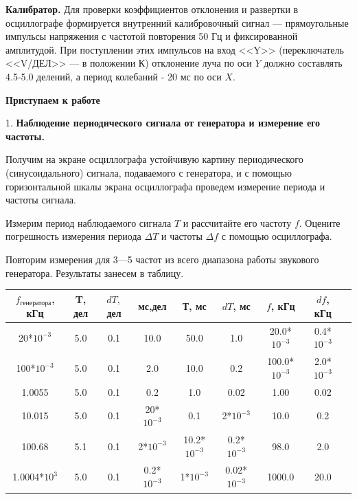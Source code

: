 \documentclass[14pt]{article}
\begin{document}
%
%

\vspace{0.5cm}
\textbf{Калибратор.} Для проверки коэффициентов отклонения и развертки в осциллографе формируется внутренний калибровочный сигнал --- прямоугольные импульсы напряжения с частотой повторения 50 Гц и фиксированной амплитудой. При поступлении этих импульсов на вход <<Y>> (переключатель <<V/ДЕЛ>> --- в положении К) отклонение луча по оси $Y$ должно составлять 4.5-5.0 делений, а период колебаний - 20 мс по оси $X$.

%
%

\vspace{1cm}
\textbf{Приступаем к работе}

\vspace{0.5cm}
1. \textbf{Наблюдение периодического сигнала от генератора и измерение его частоты.} 

Получим на экране осциллографа устойчивую картину периодического (синусоидального) сигнала, подаваемого с генератора, и с помощью горизонтальной шкалы экрана осциллографа проведем измерение периода и частоты сигнала.

Измерим период наблюдаемого сигнала $T$ и рассчитайте его частоту $f$. Оцените погрешность измерения периода $\Delta T$ и частоты $\Delta f$ с помощью осциллографа.

Повторим измерения для 3—5 частот из всего диапазона работы звукового генератора. Результаты занесем в таблицу.


\begin{center}
\begin{tabular}{|c|c|c|c|c|c|c|c|c|}
\hline
$f_\text{генератора}$, кГц	&T, дел	&  $dT,$ дел&	мс,дел			&	Т, мс			&	$dT$, мс	&	$f$, кГц		&	$df$, кГц\\
\hline
20*$10^{-3}$				&5.0	&	0.1		&	10.0			&	50.0			&	1.0			&	20.0*$10^{-3}$	&	0.4*$10^{-3}$\\
\hline
100*$10^{-3}$				&5.0	&	0.1		&	2.0				&	10.0			&	0.2			&	100.0*$10^{-3}$	&	2.0*$10^{-3}$\\
\hline
1.0055						&5.0	&	0.1		&	0.2				&	1.0				&	0.02		&	1.00			&	0.02\\
\hline
10.015						&5.0	&	0.1		&	20*$10^{-3}$	&	0.1				&	2*$10^{-3}$	&	10.0			&	0.2\\	
\hline	
100.68						&5.1	&	0.1		&	2*$10^{-3}$		&	10.2*$10^{-3}$	&	0.2*$10^{-3}$&	98.0			&	2.0\\
\hline
1.0004*$10^3$				&5.0	&	0.1		&	0.2*$10^{-3}$	&	1*$10^{-3}$		&	0.02*$10^{-3}$&	1000.0			&	20.0\\
\hline
\end{tabular}
\end{center}
\end{document}
